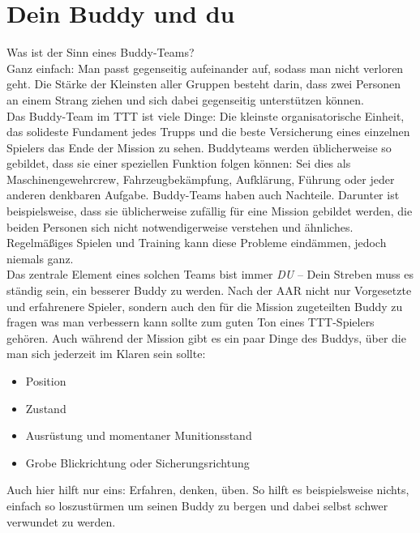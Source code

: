 \newpage
\section{Dein Buddy und du}
	Was ist der Sinn eines Buddy-Teams?\\
	Ganz einfach: Man passt gegenseitig aufeinander auf, sodass man nicht verloren geht. Die Stärke der Kleinsten aller Gruppen besteht darin, dass zwei Personen an einem Strang ziehen und sich dabei gegenseitig unterstützen können.\\
	Das Buddy-Team im \ac{TTT} ist viele Dinge: Die kleinste organisatorische Einheit, das solideste Fundament jedes Trupps und die beste Versicherung eines einzelnen Spielers das Ende der Mission zu sehen. Buddyteams werden üblicherweise so gebildet, dass sie einer speziellen Funktion folgen können: Sei dies als Maschinengewehrcrew, Fahrzeugbekämpfung, Aufklärung, Führung oder jeder anderen denkbaren Aufgabe. Buddy-Teams haben auch Nachteile. Darunter ist beispielsweise, dass sie üblicherweise zufällig für eine Mission gebildet werden, die beiden Personen sich nicht notwendigerweise verstehen und ähnliches. Regelmäßiges Spielen und Training kann diese Probleme eindämmen, jedoch niemals ganz.\\
	Das zentrale Element eines solchen Teams bist immer \textit{DU} -- Dein Streben muss es ständig sein, ein besserer Buddy zu werden. Nach der AAR nicht nur Vorgesetzte und erfahrenere Spieler, sondern auch den für die Mission zugeteilten Buddy zu fragen was man verbessern kann sollte zum guten Ton eines \ac{TTT}-Spielers gehören. Auch während der Mission gibt es ein paar Dinge des Buddys, über die man sich jederzeit im Klaren sein sollte:
		\begin{itemize}
			\item Position
			\item Zustand
			\item Ausrüstung und momentaner Munitionsstand
			\item Grobe Blickrichtung oder Sicherungsrichtung
		\end{itemize}
	Auch hier hilft nur eins: Erfahren, denken, üben. So hilft es beispielsweise nichts, einfach so loszustürmen um seinen Buddy zu bergen und dabei selbst schwer verwundet zu werden. 
